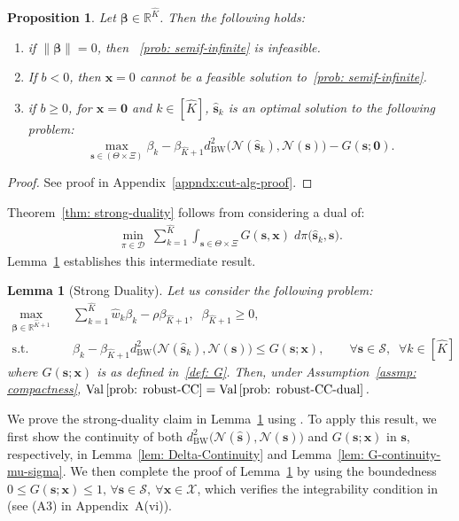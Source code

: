 \documentclass[opre,sglanonrev]{informs4}
\newtheorem{proposition}{Proposition}
\newtheorem{lemma}{Lemma}
\newcommand{\mD}{\mathcal{D}}
\newcommand{\mS}{\mathcal{S}}
\newcommand{\mN}{\mathcal{N}}
\newcommand{\mX}{\mathcal{X}}
\newcommand{\mbR}{\mathbb R}
\newcommand{\bbeta}{\bm{\beta}}
\newcommand{\bzero}{\bm{0}}
\newcommand{\bs}{\bm{s}}
\newcommand{\bx}{\bm{x}}
\newcommand{\Val}{\operatorname{Val}}
\begin{document}
{\begin{proposition}\label{prop: infeasibility-1}
    Let $\bbeta \in \mbR^{\hat{K}}$. Then the following holds:
    \begin{enumerate}[leftmargin=1.5em]
        \item[i)] if $\|\bbeta\| = 0$, then ~\eqref{prob: semif-infinite} is infeasible.
        \item[ii)] If $b <0$, then $\bx = 0$ cannot be a feasible solution to~\eqref{prob: semif-infinite}.
        \item[iii)] if $ b \geq 0$, for $\bx = \bzero$ and $k \in [\hat{K}]$, $\hat{\bs}_k$  is an optimal solution to the following problem: 
        $$\max_{\bs \in (\Theta \times \Xi)} \beta_k - \beta_{\hat{K}+1} d^2_{\mathrm{BW}}\bigl(\mN(\hat{\bs}_k), \mN(\bs) \bigr) - G(\bs; \bzero).$$
        \vspace{-2em}
    \end{enumerate}
\end{proposition}
\begin{proof}
    See proof in Appendix~\ref{appndx:cut-alg-proof}.
\end{proof}
 

Theorem~\ref{thm: strong-duality} follows from considering a dual of: 
\begin{align}\label{prob: robust-CC}
     \min_{\pi \in \mD} \;\sum_{k=1}^{\hat{K}} \int_{\bs \in \Theta \times \Xi} G(\bs, \bx) \; d\pi \bigl(\hat{\bs}_k, \bs\bigr).
\end{align}
Lemma~\ref{lem: strong-duality} establishes this intermediate result.
\begin{lemma}[Strong Duality]\label{lem: strong-duality}
    Let us consider the following problem:
\begin{align}\label{prob: robust-CC-dual}
\max_{\bbeta \in \mbR^{\hat{K}+1}} &\quad  \sum_{k=1}^{\hat{K}} \hat{w}_k\beta_k - \rho \beta_{\hat{K}+1}, \;\; \beta_{\hat{K}+1} \geq 0, \\ 
\mathrm{s.t.} &  \quad \beta_k - \beta_{\hat{K}+1} d^2_{\mathrm{BW}}\bigl(\mN(\hat{\bs}_k), \mN(\bs) \bigr) \leq G(\bs; \bx), \qquad \forall \bs\in \mS, \;\; \forall k \in [\hat{K}] \nonumber
\end{align}
where $G(\bs; \bx)$ is as defined in~\eqref{def: G}. Then, under Assumption~\ref{assmp: compactness}, $\Val\eqref{prob: robust-CC} = \Val\eqref{prob: robust-CC-dual}$.
\end{lemma}

We prove the strong-duality claim in Lemma~\ref{lem: strong-duality} using
\cite[Theorem~1(a)]{blanchet2019quantifying}. To apply this
result, we first show the continuity of both
\(d^2_{\mathrm{BW}}\bigl(\mN(\hat{\bs}),\mN(\bs)\bigr)\) and
\(G(\bs; \bx)\) in \(\bs\), respectively, in
Lemma~\ref{lem: Delta-Continuity} and
Lemma~\ref{lem: G-continuity-mu-sigma}. We then complete the proof of
Lemma~\ref{lem: strong-duality} by using the boundedness
\(0\le G(\bs;\bx)\le 1,
\, \forall \bs\in\mS,\ \forall \bx\in\mX\), which verifies the integrability
condition in \cite[Theorem~1(a)]{blanchet2019quantifying} (see (A3) in
 Appendix~A(vi)).


}
\end{document}
